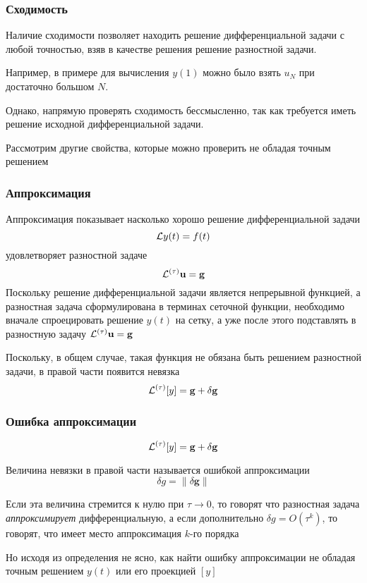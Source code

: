 \documentclass[apectratio=43,unicode]{beamer}
\begin{document}
\begin{frame}\frametitle{Сходимость}
	Наличие сходимости позволяет находить решение дифференциальной задачи с любой точностью, взяв 
	в качестве решения решение разностной задачи. 
	
	Например, в примере для вычисления $y(1)$ можно было взять $u_N$ при достаточно большом $N$.
	\pause
	
	Однако, напрямую проверять сходимость бессмысленно, так как требуется иметь решение исходной 
	дифференциальной задачи.
	
	Рассмотрим другие свойства, которые можно проверить не обладая точным решением
\end{frame}

\begin{frame}\frametitle{Аппроксимация}
	Аппроксимация показывает насколько хорошо решение дифференциальной задачи 
	$$
	\mathcal{L} y(t) = f(t)
	$$
	удовлетворяет разностной задаче
	$$
	{\mathcal{L}^{(\tau)}} \mathbf{u} = \mathbf{g}
	$$
	\pause
	Поскольку решение дифференциальной задачи является непрерывной функцией, а разностная задача 
	сформулирована в терминах сеточной функции, необходимо вначале спроецировать решение $y(t)$ на сетку,
	а уже после этого подставлять в разностную задачу ${\mathcal{L}^{(\tau)}} \mathbf{u} = \mathbf{g}$
	\pause
	
	Поскольку, в общем случае, такая функция не обязана быть решением разностной задачи, в правой части появится невязка
	$$
	{\mathcal{L}^{(\tau)}} [y] = \mathbf{g} + \delta \mathbf{g}
	$$
\end{frame}

\begin{frame}\frametitle{Ошибка аппроксимации}
	$$
	{\mathcal{L}^{(\tau)}} [y] = \mathbf{g} + \delta \mathbf{g}
	$$
	
	Величина невязки в правой части называется ошибкой аппроксимации
	$$
	\delta g = \|\delta \mathbf{g}\|
	$$
	
	Если эта величина стремится к нулю при $\tau \rightarrow 0$, то говорят что разностная задача \emph{аппроксимирует}
	дифференциальную, а если дополнительно $\delta g = O(\tau^k)$, то говорят, что имеет место аппроксимация $k$-го порядка
	\pause
	
	Но исходя из определения не ясно, как найти ошибку аппроксимации не обладая 
	точным решением $y(t)$ или его проекцией $[y]$
\end{frame}
\end{document}
